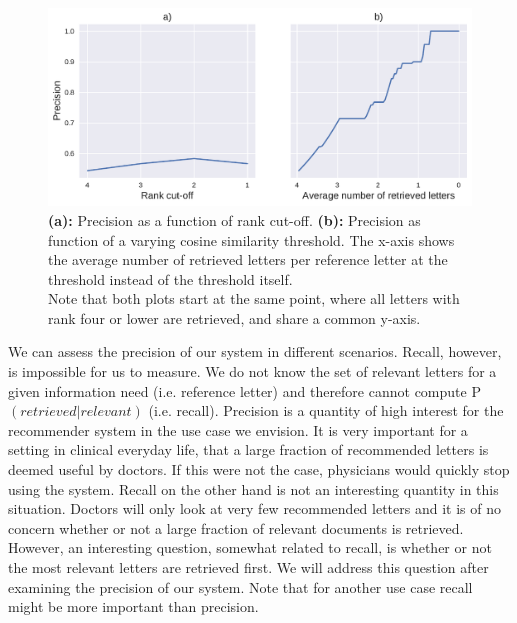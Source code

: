 \begin{figure}
	\includegraphics[width=\linewidth]{figures/precision_rank_sim}
	\caption{\textbf{(a):} Precision as a function of rank cut-off. \textbf{(b):} Precision as function of a varying cosine similarity threshold. The x-axis shows the average number of retrieved letters per reference letter at the threshold instead of the threshold itself.\\
	Note that both plots start at the same point, where all letters with rank four or lower are retrieved, and share a common y-axis.}
	\label{fig:precision}
\end{figure}

We can assess the precision of our system in different scenarios. Recall, however, is impossible for us to measure. We do not know the set of relevant letters for a given information need (i.e. reference letter) and therefore cannot compute P$(retrieved|relevant)$ (i.e. recall). Precision is a quantity of high interest for the recommender system in the use case we envision. It is very important for a setting in clinical everyday life, that a large fraction of recommended letters is deemed useful by doctors. If this were not the case, physicians would quickly stop using the system. Recall on the other hand is not an interesting quantity in this situation. Doctors will only look at very few recommended letters and it is of no concern whether or not a large fraction of relevant documents is retrieved. However, an interesting question, somewhat related to recall, is whether or not the most relevant letters are retrieved first. We will address this question after examining the precision of our system. Note that for another use case recall might be more important than precision. 

